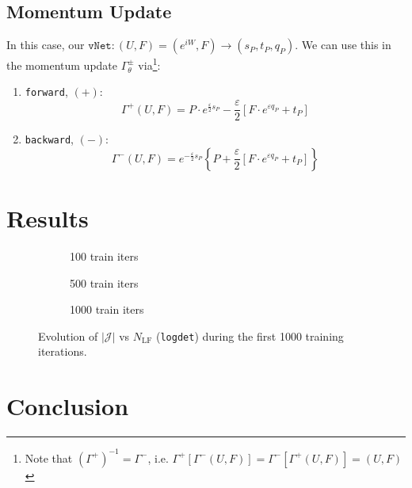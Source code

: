 \documentclass[a4paper,11pt]{article}
\begin{document}
\subsection{\label{sec:momentum-update}Momentum Update}
In this case, our $\texttt{vNet}: (U, F) = (e^{iW}, F) \rightarrow (s_{P}, t_{P}, q_{P})$.
%
We can use this in the momentum update $\Gamma^{\pm}_{\theta}$ via\footnote{Note that $\left(\Gamma^{+}\right)^{-1} = \Gamma^{-}$, i.e. $\Gamma^{+}\left[\Gamma^{-}(U, F)\right] = \Gamma^{-}\left[\Gamma^{+}(U, F)\right] = (U, F)$}:
%
\begin{enumerate}
    \item \texttt{forward}, $(+)$:
    \begin{equation}
        \Gamma^{+}(U, F) = P \cdot e^{\frac{\varepsilon}{2} s_{P}} - \frac{\varepsilon}{2}\left[ F \cdot e^{\varepsilon q_{P}} + t_{P} \right]
    \end{equation}
    \item \texttt{backward}, $(-)$:
    \begin{equation}
        \Gamma^{-}(U, F) = e^{-\frac{\varepsilon}{2} s_{P}} \left\{P + \frac{\varepsilon}{2} \left[ F \cdot e^{\varepsilon q_{P}} + t_{P} \right] \right\}
    \end{equation}
\end{enumerate}
%

\section{\label{sec:results}Results}
%
\begin{figure}[htpb!]
    \centering
    \begin{subfigure}{0.31\textwidth}
        
        \caption{\label{subfig:logdet1} 100 train iters}
    \end{subfigure}
    \hfill
    \begin{subfigure}{0.31\textwidth}
        
        \caption{\label{subfig:logdet2} 500 train iters}
    \end{subfigure}
    \hfill
    \begin{subfigure}{0.31\textwidth}
        
        \caption{\label{subfig:logdet3} 1000 train iters}
    \end{subfigure}
    \caption{\label{fig:logdet}Evolution of $\left|\mathcal{J}\right|$ vs $N_{\mathrm{LF}}$ (\texttt{logdet}) during the first 1000 training iterations.}
\end{figure}
%
%  


\section{\label{sec:conclusion}Conclusion}
\color{red}{TODO}


\end{document}
